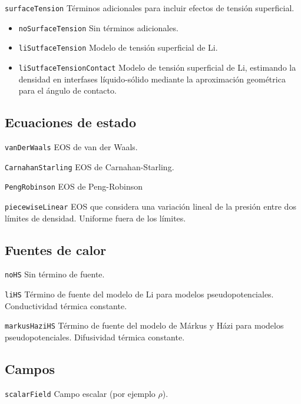 \texttt{surfaceTension}\: T\'erminos adicionales para incluir efectos de tensi\'on superficial.

\begin{itemize}
	\renewcommand{\labelitemi}{\:}
	\item \texttt{noSurfaceTension}\: Sin t\'erminos adicionales.
	\item \texttt{liSutfaceTension}\: Modelo de tensi\'on superficial de Li.
	\item \texttt{liSutfaceTensionContact}\: Modelo de tensi\'on superficial de Li, estimando la densidad en interfases l\'iquido-s\'olido mediante la aproximaci\'on geom\'etrica para el \'angulo de contacto.
\end{itemize}



\subsection{Ecuaciones de estado}

\texttt{vanDerWaals}\: EOS de van der Waals.
\medskip

\texttt{CarnahanStarling}\: EOS de Carnahan-Starling.
\medskip

\texttt{PengRobinson}\: EOS de Peng-Robinson 
\medskip

\texttt{piecewiseLinear}\: EOS que considera una variaci\'on lineal de la presi\'on entre dos l\'imites de densidad. Uniforme fuera de los l\'imites.



\subsection{Fuentes de calor}

\texttt{noHS}\: Sin t\'ermino de fuente.
\medskip

\texttt{liHS}\: T\'ermino de fuente del modelo de Li para modelos pseudopotenciales. Conductividad t\'ermica constante.
\medskip

\texttt{markusHaziHS}\: T\'ermino de fuente del modelo de M\'arkus y H\'azi para modelos pseudopotenciales. Difusividad t\'ermica constante.



\subsection{Campos}

\texttt{scalarField}\: Campo escalar (por ejemplo $\rho$).
\medskip

